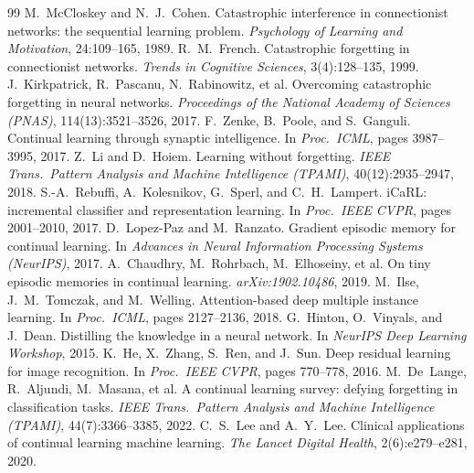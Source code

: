 \documentclass[11pt]{article}
\begin{document}
\begin{thebibliography}{99}
 M.~McCloskey and N.~J.~Cohen.
  Catastrophic interference in connectionist networks: the sequential learning
  problem. \emph{Psychology of Learning and Motivation}, 24:109--165, 1989.
 R.~M.~French.
  Catastrophic forgetting in connectionist networks.
  \emph{Trends in Cognitive Sciences}, 3(4):128--135, 1999.
 J.~Kirkpatrick, R.~Pascanu, N.~Rabinowitz, et al.
  Overcoming catastrophic forgetting in neural networks.
  \emph{Proceedings of the National Academy of Sciences (PNAS)},
  114(13):3521--3526, 2017.
 F.~Zenke, B.~Poole, and S.~Ganguli.
  Continual learning through synaptic intelligence.
  In \emph{Proc.\ ICML}, pages 3987--3995, 2017.
 Z.~Li and D.~Hoiem.
  Learning without forgetting.
  \emph{IEEE Trans.\ Pattern Analysis and Machine Intelligence (TPAMI)},
  40(12):2935--2947, 2018.
 S.-A.~Rebuffi, A.~Kolesnikov, G.~Sperl, and
  C.~H.~Lampert. iCaRL: incremental classifier and representation learning.
  In \emph{Proc.\ IEEE CVPR}, pages 2001--2010, 2017.
 D.~Lopez-Paz and M.~Ranzato.
  Gradient episodic memory for continual learning.
  In \emph{Advances in Neural Information Processing Systems (NeurIPS)}, 2017.
 A.~Chaudhry, M.~Rohrbach, M.~Elhoseiny, et al.
  On tiny episodic memories in continual learning.
  \emph{arXiv:1902.10486}, 2019.
 M.~Ilse, J.~M.~Tomczak, and M.~Welling.
  Attention-based deep multiple instance learning.
  In \emph{Proc.\ ICML}, pages 2127--2136, 2018.
 G.~Hinton, O.~Vinyals, and J.~Dean.
  Distilling the knowledge in a neural network.
  In \emph{NeurIPS Deep Learning Workshop}, 2015.
 K.~He, X.~Zhang, S.~Ren, and J.~Sun.
  Deep residual learning for image recognition.
  In \emph{Proc.\ IEEE CVPR}, pages 770--778, 2016.
 M.~De~Lange, R.~Aljundi, M.~Masana, et al.
  A continual learning survey: defying forgetting in classification tasks.
  \emph{IEEE Trans.\ Pattern Analysis and Machine Intelligence (TPAMI)},
  44(7):3366--3385, 2022.
 C.~S.~Lee and A.~Y.~Lee.
  Clinical applications of continual learning machine learning.
  \emph{The Lancet Digital Health}, 2(6):e279--e281, 2020.
\end{thebibliography}
\end{document}
